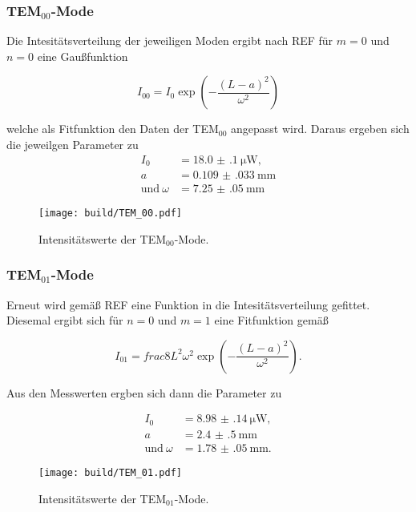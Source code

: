 \subsubsection{TEM$_{00}$-Mode}

Die Intesitätsverteilung der jeweiligen Moden ergibt nach REF für $m=0$ und $n=0$ eine Gaußfunktion

\begin{equation}
    I_{00} = I_0 \exp{\left(-\frac{(L-a)^2}{\omega^2}\right)}
\end{equation} 

welche als Fitfunktion den Daten der TEM$_{00}$ angepasst wird.
Daraus ergeben sich die jeweilgen Parameter zu
\begin{align*}
    I_0 &= \SI{18.0(1)}{\micro\watt}, \\
    a &= \SI{0.109(033)}{\milli\m} \\
    \text{und} \: \omega &= \SI{7.25(05)}{\milli\m}
\end{align*}

\begin{figure}
    \centering
    \texttt{[image: build/TEM\_00.pdf]}
    \caption{Intensitätswerte der TEM$_{00}$-Mode.}
    \label{fig:TEM00}
\end{figure}


\subsubsection{TEM$_{01}$-Mode}

Erneut wird gemäß REF eine Funktion in die Intesitätsverteilung gefittet. Diesemal ergibt sich für $n=0$ und $m=1$ 
eine Fitfunktion gemäß

\begin{equation}
    I_{01} = frac{8L^2}{\omega^2} \exp{\left(-\frac{(L-a)^2}{\omega^2} \right)} .
\end{equation}

Aus den Messwerten ergben sich dann die Parameter zu

\begin{align*}
    I_0 &= \SI{8.98(14)}{\micro\watt}, \\
    a &= \SI{2.4(5)}{\milli\m} \\
    \text{und} \: \omega &= \SI{1.78(05)}{\milli\m}.
\end{align*}

\begin{figure}
    \centering
    \texttt{[image: build/TEM\_01.pdf]}
    \caption{Intensitätswerte der TEM$_{01}$-Mode.}
    \label{fig:TEM01}
\end{figure}

